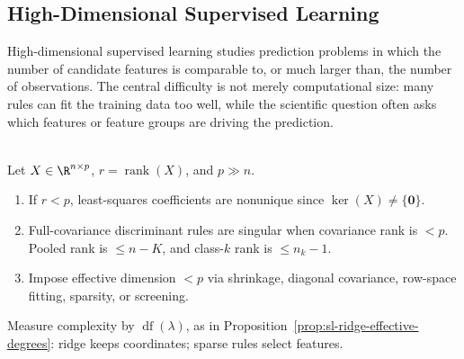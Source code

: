 \subsection{High-Dimensional Supervised Learning}

High-dimensional supervised learning studies prediction problems in which the number of candidate features is comparable to, or much larger than, the number of observations.  The central difficulty is not merely computational size: many rules can fit the training data too well, while the scientific question often asks which features or feature groups are driving the prediction.

\begin{principle} \label{prin:sl-high-dimensional-less-fitting} \\
Let $X\in\R^{n\times p}$, $r=\operatorname{rank}(X)$, and $p\gg n$.
\begin{enumerate}[label=(\roman*)]
\setlength{\itemsep}{0pt}
\item If $r<p$, least-squares coefficients are nonunique since $\ker(X)\neq\{\mathbf{0}\}$.
\item Full-covariance discriminant rules are singular when covariance rank is $<p$.\\
Pooled rank is $\leq n-K$, and class-$k$ rank is $\leq n_k-1$.
\item Impose effective dimension $<p$ via shrinkage, diagonal covariance, row-space fitting, sparsity, or screening.
\end{enumerate}
Measure complexity by $\operatorname{df}(\lambda)$, as in Proposition~\ref{prop:sl-ridge-effective-degrees}: ridge keeps coordinates; sparse rules select features.
\end{principle}

